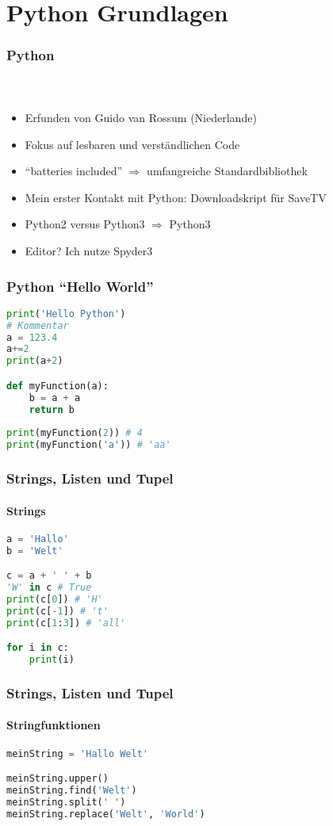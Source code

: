 \documentclass[12pt,ngerman]{beamer}
\begin{document}
\section{Python Grundlagen}

\begin{frame}
\frametitle{Python}
\framesubtitle{~}

\begin{itemize}
	\item Erfunden von Guido van Rossum (Niederlande)
	\item Fokus auf lesbaren und verständlichen Code
	\item \enquote{batteries included} $\Rightarrow$ umfangreiche Standardbibliothek
	\item Mein erster Kontakt mit Python: Downloadskript  für SaveTV
	\item Python2 versus Python3 $\Rightarrow$ Python3
	\item Editor? Ich nutze Spyder3
\end{itemize}
\end{frame}

\begin{frame}[fragile]
\frametitle{Python \enquote{Hello World}}

\begin{lstlisting}[language={Python},caption={Hello World in Python 3.x}]
print('Hello Python')
# Kommentar
a = 123.4
a+=2
print(a+2)

def myFunction(a):
    b = a + a
    return b
    
print(myFunction(2)) # 4
print(myFunction('a')) # 'aa'
\end{lstlisting}

\end{frame}


\begin{frame}[fragile]
\frametitle{Strings, Listen und Tupel}
\framesubtitle{Strings}

\begin{lstlisting}[language={Python},caption={Strings}]
a = 'Hallo'
b = 'Welt'

c = a + ' ' + b
'W' in c # True
print(c[0]) # 'H'
print(c[-1]) # 't'
print(c[1:3]) # 'all'

for i in c:
	print(i)

\end{lstlisting}
\end{frame}

\begin{frame}[fragile]
\frametitle{Strings, Listen und Tupel}
\framesubtitle{Stringfunktionen}

\begin{lstlisting}[language={Python},caption={Strings}]
meinString = 'Hallo Welt'

meinString.upper()
meinString.find('Welt')
meinString.split(' ')
meinString.replace('Welt', 'World')
\end{lstlisting}
\end{frame}
\end{document}
